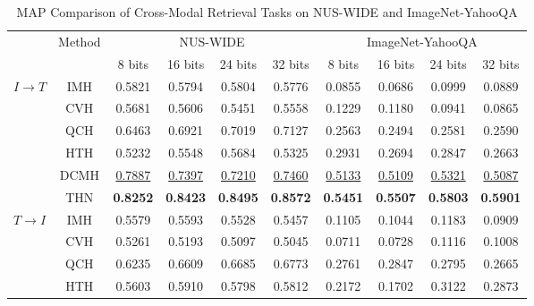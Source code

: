 \documentclass{article}
\begin{document}
\begin{table}[!htbp]
    \addtolength{\tabcolsep}{0.2pt} 
    \centering 
    \caption{MAP Comparison of Cross-Modal Retrieval Tasks on NUS-WIDE and ImageNet-YahooQA}
    \label{table:NusMAP}
    \begin{small}
    \vspace{-5pt}
    \begin{tabular}{c|c|cccc|cccc}
        \Xhline{1.0pt}
        \multirow{2}{20pt}{\centering Task} & \multirow{2}{20pt}{\centering Method} & \multicolumn{4}{c}{NUS-WIDE} & \multicolumn{4}{|c}{ImageNet-YahooQA}\\
        \cline{3-10}
        & & 8 bits & 16 bits  & 24 bits  & 32 bits & 8 bits & 16 bits  & 24 bits  & 32 bits \\
        \hline
        \multirow{6}{30pt}{\centering $ I \rightarrow T$} 
        & IMH \cite{cite:SIGMOD13IMH} & 0.5821 & 0.5794 &  0.5804 & 0.5776 & 0.0855 & 0.0686 &  0.0999 &  0.0889 \\
        & CVH \cite{cite:IJCAI11CVH} &  0.5681 &   0.5606  &  0.5451  &  0.5558 & 0.1229 & 0.1180 & 0.0941 & 0.0865\\
        & QCH \cite{cite:IJCAI15QCH}  &  0.6463  &   0.6921 &    0.7019  &  0.7127 & 0.2563  &  0.2494  &  0.2581  &  0.2590\\ 
        & HTH \cite{cite:KDD14HTH}  & 0.5232 & 0.5548 & 0.5684 & 0.5325 & 0.2931 & 0.2694 & 0.2847 & 0.2663 \\
        & DCMH \cite{cite:JDCMH16} & \underline{0.7887} & \underline{0.7397} & \underline{0.7210} & \underline{0.7460} & \underline{0.5133} & \underline{0.5109} & \underline{0.5321} & \underline{0.5087}\\
        \cline{2-10}
        & THN   & \textbf{0.8252}       & \textbf{0.8423} & \textbf{0.8495} & \textbf{0.8572}  & \textbf{0.5451} & \textbf{0.5507}  & \textbf{0.5803} & \textbf{0.5901} \\
        \hline
        \multirow{6}{30pt}{\centering $ T \rightarrow I$} 
        & IMH \cite{cite:SIGMOD13IMH} &  0.5579 & 0.5593 & 0.5528 & 0.5457 & 0.1105 & 0.1044 & 0.1183 & 0.0909\\
        & CVH \cite{cite:IJCAI11CVH} & 0.5261 &   0.5193 &   0.5097 &   0.5045 &0.0711 & 0.0728 & 0.1116 & 0.1008\\
        & QCH \cite{cite:IJCAI15QCH} & 0.6235  &  0.6609  & 0.6685 &  0.6773 &  0.2761  &   0.2847  &  0.2795  &  0.2665\\
        & HTH \cite{cite:KDD14HTH}  & 0.5603 & 0.5910 & 0.5798 & 0.5812 & 0.2172 & 0.1702 &  0.3122 &  0.2873\\

\end{tabular}
\end{small}
\end{table}
\end{document}
